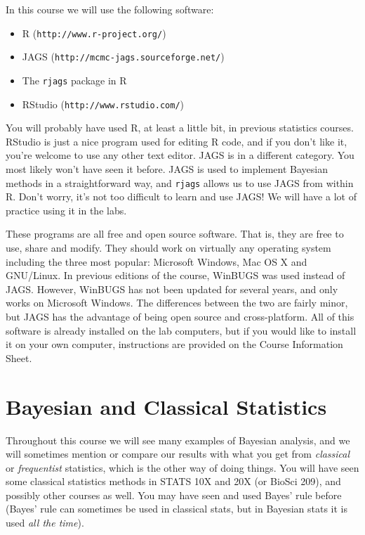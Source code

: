 In this course we will use the following software:
\begin{itemize}
\item R ({\tt http://www.r-project.org/})
\item JAGS ({\tt http://mcmc-jags.sourceforge.net/})
\item The {\tt rjags} package in R
\item RStudio ({\tt http://www.rstudio.com/})
\end{itemize}
You will probably have used R, at least a little bit, in previous statistics
courses. RStudio is just a nice program used for editing R code, and if you
don't like it, you're welcome to use any other text editor. JAGS is in a
different category. You most likely won't have seen it before. JAGS is used to
implement Bayesian methods in a straightforward way, and {\tt rjags} allows us
to use JAGS from within R.
Don't worry, it's not too difficult to learn and use JAGS! We will have a lot of
practice using it in the labs.

These programs are all free and open source software.
That is, they are free to use, share and modify. They should work on
virtually any operating system including the three most popular:
Microsoft Windows, Mac OS X and GNU/Linux. In previous editions of the course,
WinBUGS was used instead of JAGS. However, WinBUGS has not been updated for
several years, and only works on Microsoft Windows. The differences between
the two are fairly minor, but JAGS has the advantage of being open source and
cross-platform. All of this software is already installed on the lab computers,
but if you would like to install it on your own computer, instructions are
provided on the Course Information Sheet.

\section{Bayesian and Classical Statistics}
Throughout this course we will see many examples of Bayesian analysis, and we
will sometimes mention or compare our results with what you get from
{\it classical} or {\it frequentist} statistics, which is the other way of
doing things. You will have seen some classical statistics methods in STATS
10X and 20X (or BioSci 209), and possibly other courses as well.
You may have seen and used Bayes' rule before (Bayes' rule can sometimes
be used in classical stats, but in Bayesian stats it is used
{\it all the time}).

